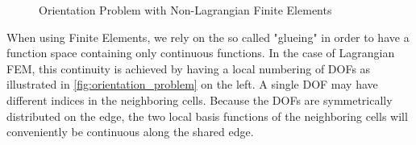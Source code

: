 \documentclass[10pt,a4paper]{article}
\begin{document}
    \begin{figure}[ht!]
        \center
        \begin{subfigure}{0.45\textwidth}
            \center
        \end{subfigure}
        \begin{subfigure}{0.45\textwidth}
            \center
        \end{subfigure}
        \caption{Orientation Problem with Non-Lagrangian Finite Elements}
        \label{fig:orientation_problem}
    \end{figure}

    When using Finite Elements, we rely on the so called "glueing" in order to have a function space containing only continuous functions. In the case of Lagrangian FEM, this continuity is achieved by having a local numbering of DOFs as illustrated in \autoref{fig:orientation_problem} on the left. A single DOF may have different indices in the neighboring cells. Because the DOFs are symmetrically distributed on the edge, the two local basis functions of the neighboring cells will conveniently be continuous along the shared edge.
    
\end{document}
